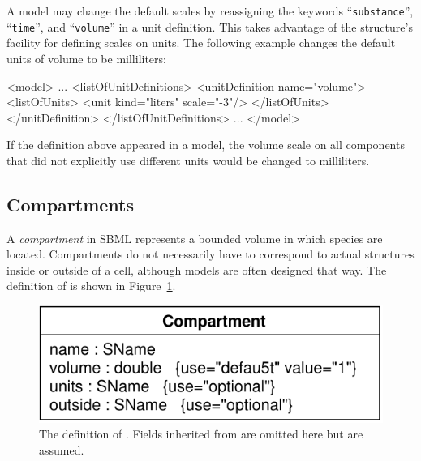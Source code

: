 \documentclass[10pt]{cekarticle}
\newcommand{\vref}[1]{\ref{#1}}
\newenvironment{blockChanged}{\color{BrickRed}}{}
\begin{document}
\begin{blockChanged}
A model may change the default scales by reassigning the keywords
``\texttt{substance}'', ``\texttt{time}'', and ``\texttt{volume}'' in a
unit definition.  This takes advantage of the 
structure's facility for defining scales on units.  The following example
changes the default units of volume to be milliliters:
\end{blockChanged}

\begin{example}
<model>
    ...
    <listOfUnitDefinitions>
        <unitDefinition name="volume">
            <listOfUnits>
                <unit kind="liters" scale="-3"/>
            </listOfUnits>                
        </unitDefinition>
    </listOfUnitDefinitions>
    ...
</model>
\end{example}

If the definition above appeared in a model, the volume scale on all
components that did not explicitly use different units would be changed to
milliliters.  


\subsection{Compartments}
\label{sec:compartments}

A \emph{compartment} in SBML represents a bounded volume in which species
are located.  Compartments do not necessarily have to correspond to actual
structures inside or outside of a cell, although models are often designed
that way.  The definition of  is shown in
Figure~\vref{fig:compartment}.

\begin{figure}[htb]
  \vspace*{8pt}
  \centering
  \includegraphics[scale = 0.68]{compartment}
  \caption{The definition of .  
    Fields inherited from  are omitted here but are assumed.}
  \label{fig:compartment}
\end{figure}
\end{document}
